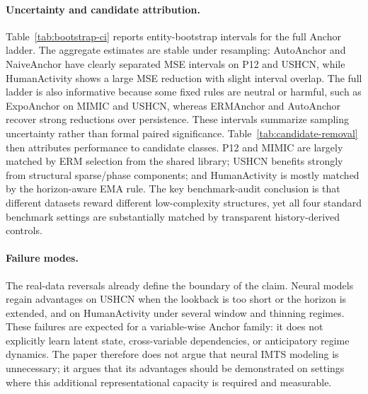 \documentclass{article}
\newcommand{\method}{AutoAnchor}
\begin{document}
\paragraph{Uncertainty and candidate attribution.}
Table~\ref{tab:bootstrap-ci} reports entity-bootstrap intervals for the full
Anchor ladder. The aggregate estimates are stable under resampling: \method{}
and NaiveAnchor have clearly separated MSE intervals on P12 and USHCN, while
HumanActivity shows a large MSE reduction with slight interval overlap. The full
ladder is also informative because some fixed rules are neutral or harmful, such
as ExpoAnchor on MIMIC and USHCN, whereas ERMAnchor and \method{} recover strong
reductions over persistence. These intervals summarize sampling uncertainty
rather than formal paired significance. Table~\ref{tab:candidate-removal} then
attributes performance to candidate classes. P12 and MIMIC are largely matched
by ERM selection from the shared library; USHCN benefits strongly from
structural sparse/phase components; and HumanActivity is mostly matched by the
horizon-aware EMA rule. The key benchmark-audit conclusion is that different
datasets reward different low-complexity structures, yet all four standard
benchmark settings are substantially matched by transparent history-derived
controls.

\paragraph{Failure modes.}
The real-data reversals already define the boundary of the claim. Neural models
regain advantages on USHCN when the lookback is too short or the horizon is
extended, and on HumanActivity under several window and thinning regimes. These
failures are expected for a variable-wise Anchor family: it does not explicitly
learn latent state, cross-variable dependencies, or anticipatory regime
dynamics. The paper therefore does not argue that neural IMTS modeling is
unnecessary; it argues that its advantages
should be demonstrated on settings where this additional representational
capacity is required and measurable.

\end{document}
